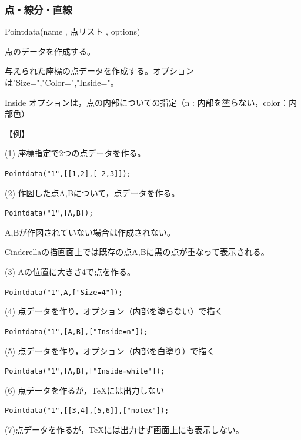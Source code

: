 \documentclass[papersize,a4paper,12pt,uplatex]{jsarticle}
\begin{document}
\subsubsection{点・線分・直線}
\begin{description}

\vspace{\baselineskip}
\hypertarget{pointdata}{}
\item[関数]Pointdata(name , 点リスト , options)
\item[機能]点のデータを作成する。
\item[説明]与えられた座標の点データを作成する。オプションは"Size=","Color=","Inside="。

Inside オプションは，点の内部についての指定（n : 内部を塗らない，color：内部色）

\vspace{\baselineskip}
【例】

(1) 座標指定で2つの点データを作る。

\hspace{10mm} \verb|Pointdata("1",[[1,2],[-2,3]]);|

(2) 作図した点A,Bについて，点データを作る。

\hspace{10mm} \verb|Pointdata("1",[A,B]);|

\hspace{5mm}A,Bが作図されていない場合は作成されない。

\hspace{5mm}Cinderellaの描画面上では既存の点A,Bに黒の点が重なって表示される。

(3) Aの位置に大きさ4で点を作る。

\hspace{10mm} \verb|Pointdata("1",A,["Size=4"]);|

(4) 点データを作り，オプション（内部を塗らない）で描く

\hspace{10mm}\verb|Pointdata("1",[A,B],["Inside=n"]);|

(5) 点データを作り，オプション（内部を白塗り）で描く

\hspace{10mm}\verb|Pointdata("1",[A,B],["Inside=white"]);|

(6) 点データを作るが，TeXには出力しない

\hspace{10mm}\verb|Pointdata("1",[[3,4],[5,6]],["notex"]);|

(7)点データを作るが，TeXには出力せず画面上にも表示しない。


\end{description}
\end{document}

